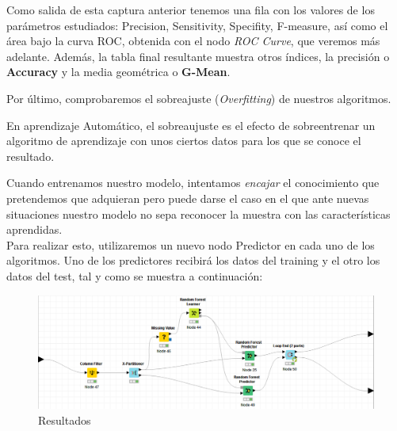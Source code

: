 	Como salida de esta captura anterior tenemos una fila con los valores de los parámetros estudiados: Precision, Sensitivity, Specifity, F-measure, así como el área bajo la curva ROC, obtenida con el nodo \textit{ROC Curve}, que veremos más adelante. Además, la tabla final resultante muestra otros índices, la precisión o \textbf{Accuracy} y la media geométrica o \textbf{G-Mean}.
	
	                                        
	
	\begin{table}[h]
	\end{table}
	
	Por último, comprobaremos el sobreajuste (\textit{Overfitting}) de nuestros algoritmos.
	
	En aprendizaje Automático, el sobreaujuste es el efecto de sobreentrenar un algoritmo de aprendizaje con unos ciertos datos para los que se conoce el resultado.
	
	 Cuando entrenamos nuestro modelo, intentamos \textit{encajar} el conocimiento que pretendemos que adquieran pero puede darse el caso en el que ante nuevas situaciones nuestro modelo no sepa reconocer la muestra con las características aprendidas. \\
	
	Para realizar esto, utilizaremos un nuevo nodo Predictor en cada uno de los algoritmos. Uno de los predictores recibirá los datos del training y el otro los datos del test, tal y como se muestra a continuación:
	
	\begin{figure}[H]
		\centering
		\includegraphics[width=1\textwidth]{img/rfover.png}
		\caption{Resultados}
	\end{figure}

